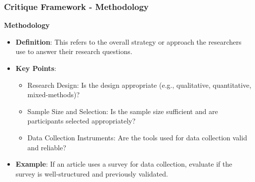 \documentclass[aspectratio=169]{beamer}
\begin{document}
\begin{frame}[fragile]
    \frametitle{Critique Framework - Methodology}
    \textbf{Methodology}
    \begin{itemize}
        \item \textbf{Definition}: This refers to the overall strategy or approach the researchers use to answer their research questions.
        \item \textbf{Key Points}:
            \begin{itemize}
                \item Research Design: Is the design appropriate (e.g., qualitative, quantitative, mixed-methods)?
                \item Sample Size and Selection: Is the sample size sufficient and are participants selected appropriately?
                \item Data Collection Instruments: Are the tools used for data collection valid and reliable?
            \end{itemize}
        \item \textbf{Example}: If an article uses a survey for data collection, evaluate if the survey is well-structured and previously validated.
    \end{itemize}
\end{frame}
\end{document}

